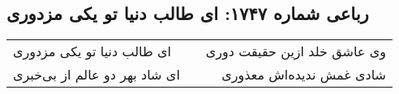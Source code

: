 \begin{center}
\section*{رباعی شماره ۱۷۴۷: ای طالب دنیا تو یکی مزدوری}
\label{sec:1747}
\begin{longtable}{l p{0.5cm} r}
ای طالب دنیا تو یکی مزدوری
&&
وی عاشق خلد ازین حقیقت دوری
\\
ای شاد بهر دو عالم از بی‌خبری
&&
شادی غمش ندیده‌اش معذوری
\\
\end{longtable}
\end{center}
